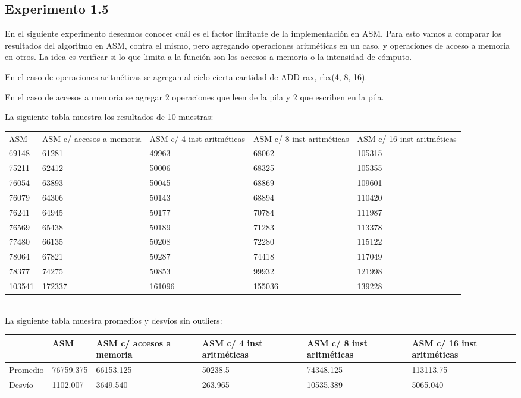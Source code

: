 ﻿\documentclass[a4paper]{article}
\begin{document}
\subsection{Experimento 1.5}


En el siguiente experimento deseamos conocer cuál es el factor limitante de la implementación en ASM. Para esto vamos a comparar los
resultados del algoritmo en ASM, contra el mismo, pero agregando operaciones aritméticas en un caso, y operaciones de acceso a memoria en otros.
La idea es verificar si lo que limita a la función son los accesos a memoria o la intensidad de cómputo.

En el caso de operaciones aritméticas se agregan al ciclo cierta cantidad de ADD rax, rbx(4, 8, 16).

En el caso de accesos a memoria se agregar 2 operaciones que leen de la pila y 2 que escriben en la pila.

La siguiente tabla muestra los resultados de 10 muestras:

\begin{center}
\begin{tabular}{| p{3cm} | p{3cm} | p{3cm} | p{3cm} | p{3cm} | }
	ASM	& ASM c/ accesos a memoria	& ASM c/ 4 inst aritméticas & 	ASM c/ 8 inst aritméticas & 	ASM c/ 16 inst aritméticas \\
	69148	& 61281	 & 49963	& 68062	&   105315    \\
	75211	& 62412	 & 50006	& 68325	&   105355    \\
	76054	& 63893	 & 50045	& 68869	&   109601    \\
	76079	& 64306	 & 50143	& 68894	&   110420    \\
	76241	& 64945	 & 50177	& 70784	&   111987    \\
	76569	& 65438	 & 50189	& 71283	&   113378    \\
	77480	& 66135	 & 50208	& 72280	&   115122    \\
	78064	& 67821	 & 50287	& 74418	&   117049    \\
	78377	& 74275	 & 50853	& 99932	&   121998    \\
	103541	& 172337 & 161096	& 155036 &   139228   \\


  
\end{tabular}
\end{center}
\ \\
La siguiente tabla muestra promedios y desvíos sin outliers:

\begin{tabular}{| p{2cm} | p{2cm} | p{2cm} | p{2cm} | p{2cm} | p{2cm} | }
      \hline
	 & ASM	& ASM c/ accesos a memoria	& ASM c/ 4 inst aritméticas	& ASM c/ 8 inst aritméticas &	ASM c/ 16 inst aritméticas	\\   
	\hline                   
	Promedio	&	76759.375	& 66153.125	& 50238.5	& 74348.125	& 113113.75 \\
	\hline
	Desvío	&	1102.007	& 3649.540	& 263.965	& 10535.389	& 5065.040
 \\
	\hline

  
\end{tabular}
\ \\
\end{document}
